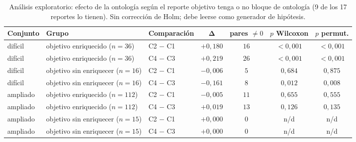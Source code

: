 \begin{table}[htbp]
\centering
\footnotesize
\setlength{\tabcolsep}{5pt}
\renewcommand{\arraystretch}{1.25}
\caption{Análisis exploratorio: efecto de la ontología según el reporte objetivo tenga o no bloque de ontología (9 de los 17 reportes lo tienen). Sin corrección de Holm; debe leerse como generador de hipótesis.}
\label{tab:cobertura}
\begin{tabularx}{\textwidth}{@{}l l l c c c c@{}}
\toprule
\textbf{Conjunto} & \textbf{Grupo} & \textbf{Comparación} & $\boldsymbol{\Delta}$ & \textbf{pares $\neq 0$} & \textbf{$p$ Wilcoxon} & \textbf{$p$ permut.} \\
\midrule
difícil & objetivo enriquecido ($n{=}36$) & C2 $-$ C1 & $+0{,}180$ & $16$ & $<\!0{,}001$ & $<\!0{,}001$ \\
difícil & objetivo enriquecido ($n{=}36$) & C4 $-$ C3 & $+0{,}219$ & $26$ & $<\!0{,}001$ & $<\!0{,}001$ \\
difícil & objetivo sin enriquecer ($n{=}16$) & C2 $-$ C1 & $-0{,}006$ & $5$ & $0{,}684$ & $0{,}875$ \\
difícil & objetivo sin enriquecer ($n{=}16$) & C4 $-$ C3 & $-0{,}161$ & $8$ & $0{,}012$ & $0{,}008$ \\
ampliado & objetivo enriquecido ($n{=}112$) & C2 $-$ C1 & $-0{,}005$ & $11$ & $0{,}655$ & $0{,}555$ \\
ampliado & objetivo enriquecido ($n{=}112$) & C4 $-$ C3 & $+0{,}019$ & $13$ & $0{,}126$ & $0{,}135$ \\
ampliado & objetivo sin enriquecer ($n{=}15$) & C2 $-$ C1 & $+0{,}000$ & $0$ & n/d & n/d \\
ampliado & objetivo sin enriquecer ($n{=}15$) & C4 $-$ C3 & $+0{,}000$ & $0$ & n/d & n/d \\
\bottomrule
\end{tabularx}
\end{table}

